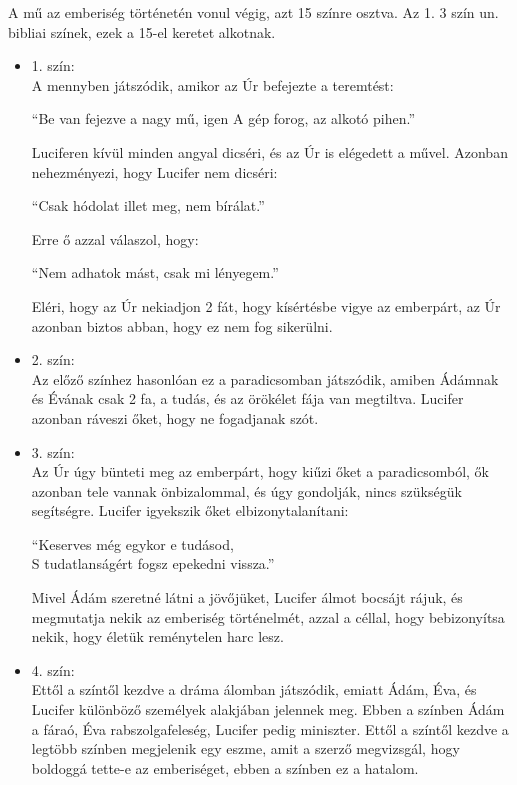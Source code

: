 \documentclass[]{article}
\begin{document}
	A mű az emberiség történetén vonul végig, azt 15 színre osztva. Az 1. 3 szín un. bibliai színek, ezek a 15-el keretet alkotnak.
	\begin{itemize}
		\item 1. szín:\\
			A mennyben játszódik, amikor az Úr befejezte a teremtést:
			\begin{displayquote}
				\enquote{Be van fejezve a nagy mű, igen A gép forog, az alkotó pihen.}
			\end{displayquote}
			Luciferen kívül minden angyal dicséri, és az Úr is elégedett a művel. Azonban nehezményezi, hogy Lucifer nem dicséri:
			\begin{displayquote}
				\enquote{Csak hódolat illet meg, nem bírálat.}
			\end{displayquote}
			Erre ő azzal válaszol, hogy:
			\begin{displayquote}
				\enquote{Nem adhatok mást, csak mi lényegem.}
			\end{displayquote}
			Eléri, hogy az Úr nekiadjon 2 fát, hogy kísértésbe vigye az emberpárt, az Úr azonban biztos abban, hogy ez nem fog sikerülni.
		\item 2. szín:\\
			Az előző színhez hasonlóan ez a paradicsomban játszódik, amiben Ádámnak és Évának csak 2 fa, a tudás, és az örökélet fája van megtiltva. Lucifer azonban ráveszi őket, hogy ne fogadjanak szót.
		\item 3. szín:\\
			Az Úr úgy bünteti meg az emberpárt, hogy kiűzi őket a paradicsomból, ők azonban tele vannak önbizalommal, és úgy gondolják, nincs szükségük segítségre. Lucifer igyekszik őket elbizonytalanítani:
			\begin{displayquote}
				\enquote{Keserves még egykor e tudásod, \\
			S tudatlanságért fogsz epekedni vissza.}
			\end{displayquote}
			Mivel Ádám szeretné látni a jövőjüket, Lucifer álmot bocsájt rájuk, és megmutatja nekik az emberiség történelmét, azzal a céllal, hogy bebizonyítsa nekik, hogy életük reménytelen harc lesz.
		\item 4. szín:\\
			Ettől a színtől kezdve a dráma álomban játszódik, emiatt Ádám, Éva, és Lucifer különböző személyek alakjában jelennek meg. Ebben a színben Ádám a fáraó, Éva rabszolgafeleség, Lucifer pedig miniszter. Ettől a színtől kezdve a legtöbb színben megjelenik egy eszme, amit a szerző megvizsgál, hogy boldoggá tette-e az emberiséget, ebben a színben ez a hatalom.
			

\end{itemize}
\end{document}
